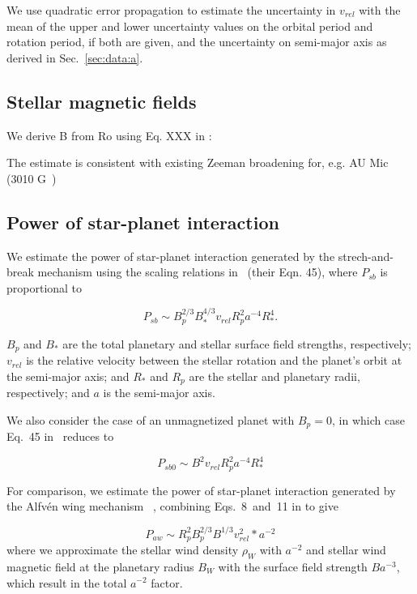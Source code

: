 \documentclass[twocolumn]{aastex631}
\begin{document}
We use quadratic error propagation to estimate the uncertainty in $v_{rel}$ with the mean of the upper and lower uncertainty values on the orbital period and rotation period, if both are given, and the uncertainty on semi-major axis as derived in Sec.~\ref{sec:data:a}. 

\subsection{Stellar magnetic fields}
We derive B from Ro using Eq. XXX in \cite{reiners2022magnetism}:


The estimate is consistent with existing Zeeman broadening for, e.g. AU Mic (3010 G~\cite{reiners2022magnetism})
\subsection{Power of star-planet interaction}


We estimate the power of star-planet interaction generated by the strech-and-break mechanism using the scaling relations in~\cite{lanza2012starplanet} (their Eqn. 45), where $P_{sb}$ is proportional to

\begin{equation}
    P_{sb} \sim B_p^{2/3} B_*^{4/3} v_{rel} R_p^2 a^{-4} R_*^4.
\end{equation}

$B_p$ and $B_*$ are the total planetary and stellar surface field strengths, respectively; $v_{rel}$ is the relative velocity between the stellar rotation and the planet's orbit at the semi-major axis; and $R_*$ and $R_p$ are the stellar and planetary radii, respectively; and $a$ is the semi-major axis.


We also consider the case of an unmagnetized planet with $B_p=0$, in which case Eq.~45 in~\cite{lanza2012starplanet} reduces to

\begin{equation}
    P_{sb0} \sim B^2 v_{rel}  R_p^2  a^{-4} R_*^4
\end{equation}

For comparison, we estimate the power of star-planet interaction generated by the Alfv\'en wing mechanism ~\cite{saur2013magnetic,kavanagh2022radio}, combining Eqs.~8~and~11 in \cite{kavanagh2022radio} to give

\begin{equation}
    P_{aw} \sim R_{p}^2  B_p^{2/3}  B^{1/3}  v_{rel}^2 * a^{-2}  
\end{equation}
where we approximate the stellar wind density $\rho_W$ with $a^{-2}$ and stellar wind magnetic field at the planetary radius $B_W$ with the surface field strength $B a^{-3}$, which result in the total $a^{-2}$ factor.
\end{document}
